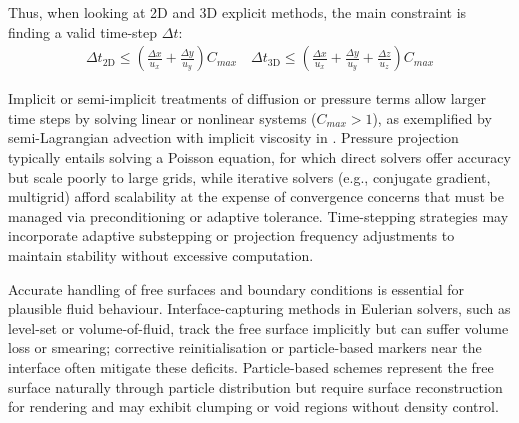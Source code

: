 
Thus, when looking at 2D and 3D explicit methods, the main constraint is finding a valid time-step $\Delta t$:
\begin{align}
    \Delta t_{\text{2D}} \leq \left( \frac{\Delta x}{u_x} + \frac{\Delta y}{u_y} \right) C_{max}
    \quad
    \Delta t_{\text{3D}} \leq \left( \frac{\Delta x}{u_x} + \frac{\Delta y}{u_y} + \frac{\Delta z}{u_z} \right) C_{max}
\end{align}

Implicit or semi-implicit treatments of diffusion or pressure terms allow larger time steps by solving linear or nonlinear systems ($C_{max} > 1$), as exemplified by semi-Lagrangian advection with implicit viscosity in \cite{Stam1999}. Pressure projection typically entails solving a Poisson equation, for which direct solvers offer accuracy but scale poorly to large grids, while iterative solvers (e.g., conjugate gradient, multigrid) afford scalability at the expense of convergence concerns that must be managed via preconditioning or adaptive tolerance. Time-stepping strategies may incorporate adaptive substepping or projection frequency adjustments to maintain stability without excessive computation.

Accurate handling of free surfaces and boundary conditions is essential for plausible fluid behaviour. Interface-capturing methods in Eulerian solvers, such as level-set or volume-of-fluid, track the free surface implicitly but can suffer volume loss or smearing; corrective reinitialisation or particle-based markers near the interface often mitigate these deficits. Particle-based schemes represent the free surface naturally through particle distribution but require surface reconstruction for rendering and may exhibit clumping or void regions without density control. 

